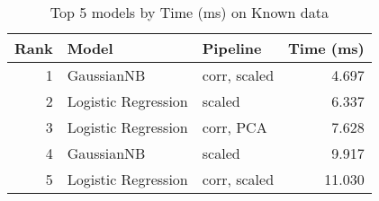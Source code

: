 \begin{table}[!htb]
\centering
\begin{tabular}{rllr}
\toprule
Rank & Model & Pipeline & Time (ms) \\
\midrule
1 & GaussianNB & corr, scaled & 4.697 \\
2 & Logistic Regression & scaled & 6.337 \\
3 & Logistic Regression & corr, PCA & 7.628 \\
4 & GaussianNB & scaled & 9.917 \\
5 & Logistic Regression & corr, scaled & 11.030 \\
\bottomrule
\end{tabular}
\caption{Top 5 models by Time (ms) on Known data}
\label{table-top-5-time-(ms)-known}
\end{table}
